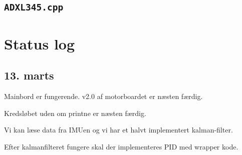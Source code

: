 \documentclass[a4paper,11pt,oneside,article,danish,table]{memoir}
\begin{document}
\section{\texttt{ADXL345.cpp}}


\chapter{Status log}

\section{13. marts}
Mainbord er fungerende. v2.0 af motorboardet er næsten færdig.

Kredsløbet uden om printne er næsten færdig.

Vi kan læse data fra IMUen og vi har et halvt implementert kalman-filter.

Efter kalmanfilteret fungere skal der implementeres PID med wrapper kode.
\end{document}
